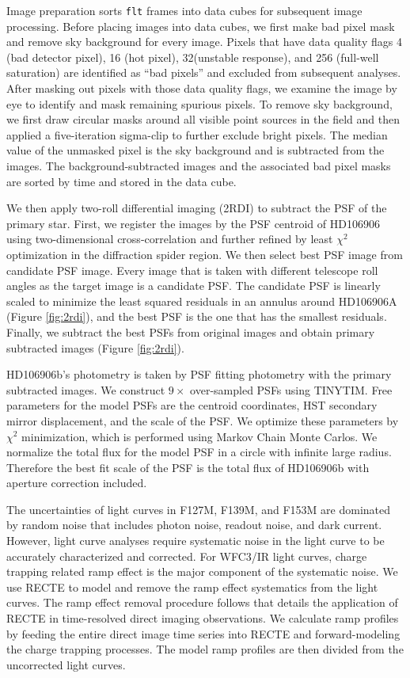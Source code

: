 \documentclass[twocolumn]{aastex62}
\begin{document}
Image preparation sorts \texttt{flt} frames into data cubes for subsequent image processing. Before placing images into data cubes, we first make bad pixel mask and remove sky background for every image. Pixels that have data quality flags 4 (bad detector pixel), 16 (hot pixel), 32(unstable response), and 256 (full-well saturation) are identified as ``bad pixels'' and excluded from subsequent analyses. After masking out pixels with those data quality flags, we examine the image by eye to identify and mask remaining spurious pixels. To remove sky background, we first draw circular masks around all visible point sources in the field and then applied a five-iteration sigma-clip to further exclude bright pixels. The median value of the unmasked pixel is the sky background and  is subtracted from the images. The background-subtracted images and the associated bad pixel masks are sorted by time and stored in the data cube.

We then apply two-roll differential imaging (2RDI) to subtract the PSF of the primary star. First, we register the images by the PSF centroid of HD106906 using two-dimensional cross-correlation and further refined by least $\chi^{2}$ optimization in the diffraction spider region. We then select best PSF image from candidate PSF image. Every image that is taken with different telescope roll angles as the target image is a candidate PSF. The candidate PSF is linearly scaled to minimize the least squared residuals in an annulus around HD106906A (Figure \ref{fig:2rdi}), and the best PSF is the one that has the smallest residuals. Finally, we subtract the best PSFs from original images and obtain primary subtracted images (Figure \ref{fig:2rdi}). 

HD106906b's photometry is taken by PSF fitting photometry with the primary subtracted images. We construct $9\times$ over-sampled PSFs using TINYTIM. Free parameters for the model PSFs are the centroid coordinates, HST secondary mirror displacement, and the scale of the PSF. We optimize these parameters by $\chi^{2}$ minimization, which is performed using Markov Chain Monte Carlos. We normalize the total flux for the model PSF in a circle with infinite large radius. Therefore the best fit scale of the PSF is the total flux  of HD106906b with  aperture correction included. 

The uncertainties of light curves in F127M, F139M, and F153M are dominated by random noise that includes photon noise, readout noise, and dark current. However, light curve analyses require systematic noise in the light curve to be accurately characterized and corrected. For WFC3/IR light curves, charge trapping related ramp effect is the major component of the systematic noise. We use RECTE \citep{Zhou2017} to model and remove the ramp effect systematics from the light curves. The ramp effect removal procedure follows \citet{Zhou2019} that details the application of RECTE in time-resolved direct imaging observations. We calculate ramp profiles by feeding the entire direct image time series into RECTE and forward-modeling the charge trapping processes. The model ramp profiles are then divided from the uncorrected light curves.
\end{document}
